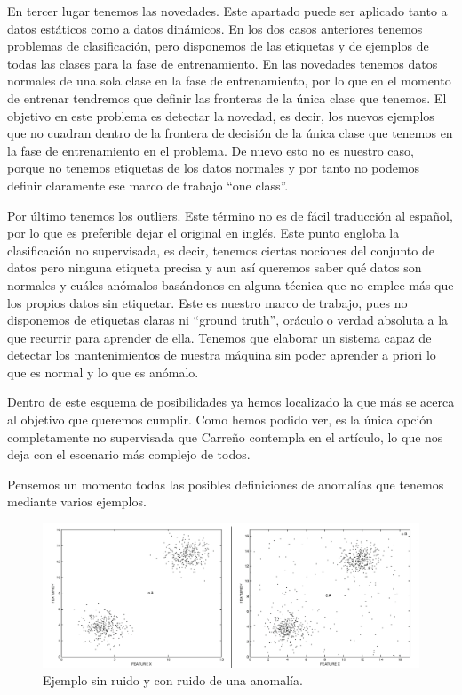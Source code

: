 En tercer lugar tenemos las novedades. Este apartado puede ser aplicado tanto a datos estáticos como a datos dinámicos. En los dos casos anteriores tenemos problemas de clasificación, pero disponemos de las etiquetas y de ejemplos de todas las clases para la fase de entrenamiento. En las novedades tenemos datos normales de una sola clase en la fase de entrenamiento, por lo que en el momento de entrenar tendremos que definir las fronteras de la única clase que tenemos. El objetivo en este problema es detectar la novedad, es decir, los nuevos ejemplos que no cuadran dentro de la frontera de decisión de la única clase que tenemos en la fase de entrenamiento en el problema. De nuevo esto no es nuestro caso, porque no tenemos etiquetas de los datos normales y por tanto no podemos definir claramente ese marco de trabajo ``one class''.

Por último tenemos los outliers. Este término no es de fácil traducción al español, por lo que es preferible dejar el original en inglés. Este punto engloba la clasificación no supervisada, es decir, tenemos ciertas nociones del conjunto de datos pero ninguna etiqueta precisa y aun así queremos saber qué datos son normales y cuáles anómalos basándonos en alguna técnica que no emplee más que los propios datos sin etiquetar. Este es nuestro marco de trabajo, pues no disponemos de etiquetas claras ni ``ground truth'', oráculo o verdad absoluta a la que recurrir para aprender de ella. Tenemos que elaborar un sistema capaz de detectar los mantenimientos de nuestra máquina sin poder aprender a priori lo que es normal y lo que es anómalo.

Dentro de este esquema de posibilidades ya hemos localizado la que más se acerca al objetivo que queremos cumplir. Como hemos podido ver, es la única opción completamente no supervisada que Carreño contempla en el artículo, lo que nos deja con el escenario más complejo de todos. 

Pensemos un momento todas las posibles definiciones de anomalías que tenemos mediante varios ejemplos.

\begin{figure}[H]
	\centering
	\includegraphics[scale=0.35]{imagenes/ejemplo1_anomalia.png}
	\caption{Ejemplo sin ruido y con ruido de una anomalía. \cite[p21]{aggarwal_outlier_2017}}
	\label{img:ejemplo1-anomalia}
\end{figure}

